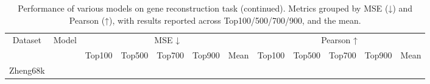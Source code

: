 \begin{table}[htbp]

  \centering

  \renewcommand\arraystretch{1.1}

  \scriptsize

  \caption{Performance of various models on gene reconstruction task (continued). Metrics grouped by MSE (↓) and Pearson (↑), with results reported across Top100/500/700/900, and the mean.}

  \label{tab:topk_grouped_metric_all_cont}

  \setlength{\tabcolsep}{4pt}

  \begin{tabular}{cl|ccccc|ccccc}

    \toprule
    \multirow{2}{*}{Dataset} & \multirow{2}{*}{Model}
      & \multicolumn{5}{c|}{MSE ↓}
      & \multicolumn{5}{c}{Pearson ↑} \\
    \cmidrule(lr){3-7} \cmidrule(lr){8-12}
     & & Top100 & Top500 & Top700 & Top900 & Mean
       & Top100 & Top500 & Top700 & Top900 & Mean \\
    \midrule

    \multirow{9}{*}{Zheng68k}


\end{tabular}
\end{table}
